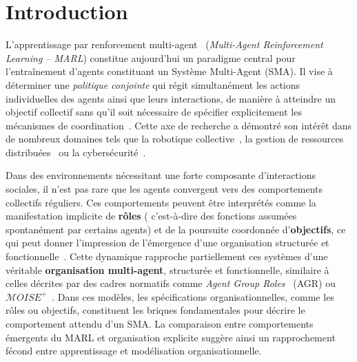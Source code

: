 \documentclass[francais,ROIA,Unicode,manuscript]{cedram}
\title
[MOISE+MARL]
{MOISE+MARL : un cadre organisationnel pour l’explicabilité et le contrôle en apprentissage par renforcement multi-agent \textsuperscript{(1)}}
\author{\firstname{Julien} \lastname{Soulé}}
\author{\firstname{Michel} \lastname{Occello}}
\author{\firstname{Jean-Paul} \lastname{Jamont}}
\author{\firstname{Louis-Marie} \lastname{Traonouez}}
\author{\firstname{Paul} \lastname{Théron}}
\begin{document}
\maketitle


\section{Introduction}


\noindent
L'apprentissage par renforcement multi-agent~\cite{maisonhaute2024} (\textit{Multi-Agent Reinforcement Learning -- MARL}) constitue aujourd'hui un paradigme central pour l'entraînement d'agents constituant un Système Multi-Agent (SMA). Il vise à déterminer une \emph{politique conjointe} qui régit simultanément les actions individuelles des agents ainsi que leurs interactions, de manière à atteindre un objectif collectif sans qu'il soit nécessaire de spécifier explicitement les mécanismes de coordination~\cite{Albrecht2024book}.
%
Cette axe de recherche a démontré son intérêt dans de nombreux domaines tels que la robotique collective~\cite{Wang2025}, la gestion de ressources distribuées~\cite{Chahoud2025} ou la cybersécurité~\cite{Hammar2023}.

\noindent
Dans des environnements nécessitant une forte composante d'interactions sociales, il n’est pas rare que les agents convergent vers des comportements collectifs réguliers. Ces comportements peuvent être interprétés comme la manifestation implicite de \textbf{rôles} ( c’est-à-dire des fonctions assumées spontanément par certains agents) et de la poursuite coordonnée d’\textbf{objectifs}, ce qui peut donner l’impression de l’émergence d’une organisation structurée et fonctionnelle~\cite{Foerster2016}.
%
Cette dynamique rapproche partiellement ces systèmes d’une véritable \textbf{organisation multi-agent}, structurée et fonctionnelle, similaire à celles décrites par des cadres normatifs comme \textit{Agent Group Roles}~\cite{ferber2003} (AGR) ou $\mathcal{M}OISE^+$~\cite{Hubner2007}. Dans ces modèles, les spécifications organisationnelles, comme les rôles ou objectifs, constituent les briques fondamentales pour décrire le comportement attendu d’un SMA. La comparaison entre comportements émergents du MARL et organisation explicite suggère ainsi un rapprochement fécond entre apprentissage et modélisation organisationnelle.
\end{document}
